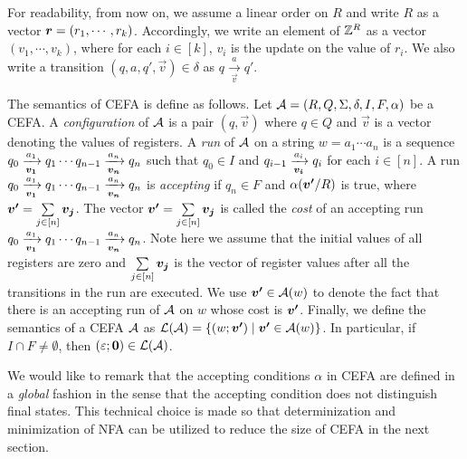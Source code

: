For readability, from now on, we assume a linear order on $R$ and write $R$ as a vector $\myvec{r} = (r_1, \cdots, r_k)$. Accordingly, we write an element of $\mathbb{Z}^R$ as a vector $(v_1, \cdots, v_k)$, where for each $i \in [k]$, $v_i$ is the update on the value of $r_i$. We also write a transition $(q, a, q', \vec{v}) \in \delta$ as $q \xrightarrow[\vec{v}]{a} q'$.

The semantics of CEFA is define as follows. Let $\mathcal{A} = (R, Q, \Sigma, \delta, I, F, \alpha)$ be a CEFA. 
A \emph{configuration} of $\mathcal{A}$ is a pair $(q, \vec{v})$ where $q \in Q$ and $\vec{v}$ is a vector denoting the values of registers.  
A \emph{run} of $\mathcal{A}$ on a string $w = a_1 \cdots a_n$ is a sequence $q_0 \xrightarrow[\myvec{v_1}]{a_1} q_1 \cdots q_{n-1}\xrightarrow[\myvec{v_n}]{a_n} q_n$ such that $q_0 \in I$ and $q_{i-1} \xrightarrow[\myvec{v_i}]{a_i} q_i$ for each $i \in [n]$. A run $q_0 \xrightarrow[\myvec{v_1}]{a_1} q_1 \cdots q_{n-1}\xrightarrow[\myvec{v_n}]{a_n} q_n$ is \emph{accepting} if $q_n \in F$ and $\alpha(\myvec{v'}/R)$ is true, where $\myvec{v'} = \sum \limits_{j \in [n]} \myvec{v_j}$. The vector $\myvec{v'}= \sum \limits_{j \in [n]} \myvec{v_j}$ is called the \emph{cost} of an accepting run $q_0 \xrightarrow[\myvec{v_1}]{a_1} q_1 \cdots q_{n-1}\xrightarrow[\myvec{v_n}]{a_n} q_n$. Note here we assume that the initial values of all registers are zero and $\sum \limits_{j \in [n]} \myvec{v_j}$ is the vector of register values after all the transitions in the run are executed.  We use $\myvec{v'} \in \aut(w)$ to denote the fact that there is an accepting run of $\mathcal{A}$ on $w$ whose cost is $\myvec{v'}$.  
Finally, we define the semantics of a CEFA $\mathcal{A}$ as $\Lang(\aut) = \{(w; \myvec{v'}) \mid  \myvec{v'} \in \aut(w)\}$.  In particular, if $I \cap F \neq \emptyset$, then $(\varepsilon; \myvec{0}) \in \Lang(\aut)$.

We would like to remark that the accepting conditions $\alpha$ in CEFA are defined in a \emph{global} fashion in the sense that the accepting condition does not distinguish final states. This technical choice is made so that determinization and minimization of NFA can be utilized to reduce the size of CEFA in the next section. 

%

